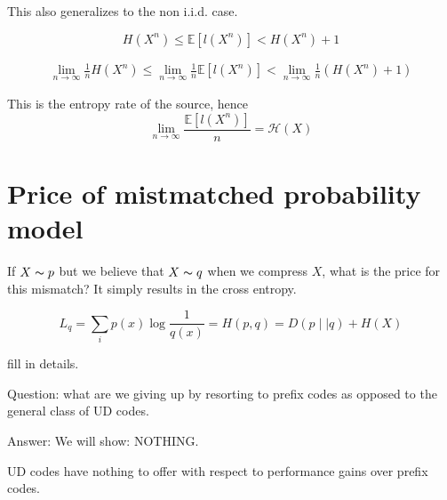 This also generalizes to the non i.i.d. case. 

\[
    H(X^n) \leq \mathbb{E} \left[ l(X^n) \right] < H(X^n) + 1
\]

\begin{align*}
    \lim_{n \to \infty} \frac{1}{n} H(X^n) \leq  \lim_{n \to \infty} \frac{1}{n} \mathbb{E} \left[ l(X^n) \right] < \lim_{n \to \infty} \frac{1}{n} (H(X^n) + 1)
\end{align*}

This is the entropy rate of the source, hence 
\[
    \lim_{n \to \infty} \frac{\mathbb{E} \left[ l(X^n) \right] }{n} = \mathcal{H} (X) 
\]

\section{Price of mistmatched probability model}

If \(X \thicksim p\) but we believe that \(X \thicksim q\) when we compress \(X\), what is the price for this mismatch? It simply results in the cross entropy. 

\[
    L_{q} = \sum_{i}  p(x) \log \frac{1}{q(x)}= H(p,q) = D(p \mid \mid q) + H(X)
\]

fill in details. 

Question: what are we giving up by resorting to prefix codes as opposed to the general class of UD codes. 

Answer: We will show: NOTHING. 

UD codes have nothing to offer with respect to performance gains over prefix codes. 

